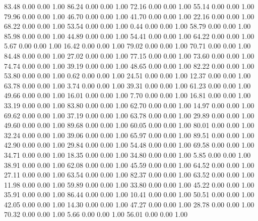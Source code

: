    83.48   0.00   0.00   1.00
   86.24   0.00   0.00   1.00
   72.16   0.00   0.00   1.00
   55.14   0.00   0.00   1.00
   79.96   0.00   0.00   1.00
   46.70   0.00   0.00   1.00
   41.70   0.00   0.00   1.00
   22.16   0.00   0.00   1.00
   68.22   0.00   0.00   1.00
   53.54   0.00   0.00   1.00
    0.44   0.00   0.00   1.00
   58.79   0.00   0.00   1.00
   85.98   0.00   0.00   1.00
   44.89   0.00   0.00   1.00
   54.41   0.00   0.00   1.00
   64.22   0.00   0.00   1.00
    5.67   0.00   0.00   1.00
   16.42   0.00   0.00   1.00
   79.02   0.00   0.00   1.00
   70.71   0.00   0.00   1.00
   84.48   0.00   0.00   1.00
   27.02   0.00   0.00   1.00
   77.15   0.00   0.00   1.00
   73.60   0.00   0.00   1.00
   74.74   0.00   0.00   1.00
   39.19   0.00   0.00   1.00
   48.65   0.00   0.00   1.00
   82.22   0.00   0.00   1.00
   53.80   0.00   0.00   1.00
    0.62   0.00   0.00   1.00
   24.51   0.00   0.00   1.00
   12.37   0.00   0.00   1.00
   63.78   0.00   0.00   1.00
    3.74   0.00   0.00   1.00
   39.31   0.00   0.00   1.00
   61.23   0.00   0.00   1.00
   49.66   0.00   0.00   1.00
   16.01   0.00   0.00   1.00
    7.70   0.00   0.00   1.00
   16.81   0.00   0.00   1.00
   33.19   0.00   0.00   1.00
   83.80   0.00   0.00   1.00
   62.70   0.00   0.00   1.00
   14.97   0.00   0.00   1.00
   69.62   0.00   0.00   1.00
   37.19   0.00   0.00   1.00
   63.78   0.00   0.00   1.00
   29.89   0.00   0.00   1.00
   49.60   0.00   0.00   1.00
   89.68   0.00   0.00   1.00
   60.05   0.00   0.00   1.00
   80.01   0.00   0.00   1.00
   32.24   0.00   0.00   1.00
   39.06   0.00   0.00   1.00
   65.97   0.00   0.00   1.00
   89.51   0.00   0.00   1.00
   42.90   0.00   0.00   1.00
   29.84   0.00   0.00   1.00
   54.48   0.00   0.00   1.00
   69.58   0.00   0.00   1.00
   34.71   0.00   0.00   1.00
   18.35   0.00   0.00   1.00
   34.80   0.00   0.00   1.00
    5.85   0.00   0.00   1.00
   38.91   0.00   0.00   1.00
   62.08   0.00   0.00   1.00
   45.59   0.00   0.00   1.00
   64.52   0.00   0.00   1.00
   27.11   0.00   0.00   1.00
   63.54   0.00   0.00   1.00
   82.37   0.00   0.00   1.00
   63.52   0.00   0.00   1.00
   11.98   0.00   0.00   1.00
   59.89   0.00   0.00   1.00
   33.80   0.00   0.00   1.00
   45.22   0.00   0.00   1.00
   35.91   0.00   0.00   1.00
   86.44   0.00   0.00   1.00
   10.41   0.00   0.00   1.00
   50.51   0.00   0.00   1.00
   42.05   0.00   0.00   1.00
   14.30   0.00   0.00   1.00
   47.27   0.00   0.00   1.00
   28.78   0.00   0.00   1.00
   70.32   0.00   0.00   1.00
    5.66   0.00   0.00   1.00
   56.01   0.00   0.00   1.00
